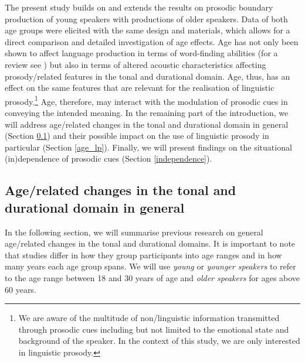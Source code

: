 \documentclass[output=paper]{langscibook}
\begin{document}
The present study builds on and extends the results on prosodic boundary production of young speakers \citep{huttenlauchetal2021} with productions of older speakers. Data of both age groups were elicited with the same design and materials, which allows for a direct comparison and detailed investigation of age effects. Age has not only been shown to affect language production in terms of word-finding abilities (for a review see \citealt{burke_wordfinding_age2004}) but also in terms of altered acoustic characteristics affecting prosody\-/related features in the tonal and durational domain. Age, thus, has an effect on the same features that are relevant for the realisation of linguistic prosody.\footnote{We are aware of the multitude of non\-/linguistic information transmitted through prosodic cues including but not limited to the emotional state and background of the speaker. In the context of this study, we are only interested in linguistic prosody.} Age, therefore, may interact with the modulation of prosodic cues in conveying the intended meaning. In the remaining part of the introduction, we will address age\-/related changes in the tonal and durational domain in general (Section \ref{age_general}) and their possible impact on the use of linguistic prosody in particular (Section \ref{age_lp}). Finally, we will present findings on the situational (in)de\-pen\-dence of prosodic cues (Section \ref{independence}).

\subsection{Age\-/related changes in the tonal and durational domain in general}\label{age_general}\largerpage
In the following section, we will summarise previous research on general age\-/related changes in the tonal and durational domains. It is important to note that studies differ in how they group participants into age ranges and in how many years each age group spans.
We will use \textit{young} or \textit{younger speakers} to refer to the age range between 18 and 30 years of age and \textit{older speakers} for ages above 60 years.
 
\end{document}
